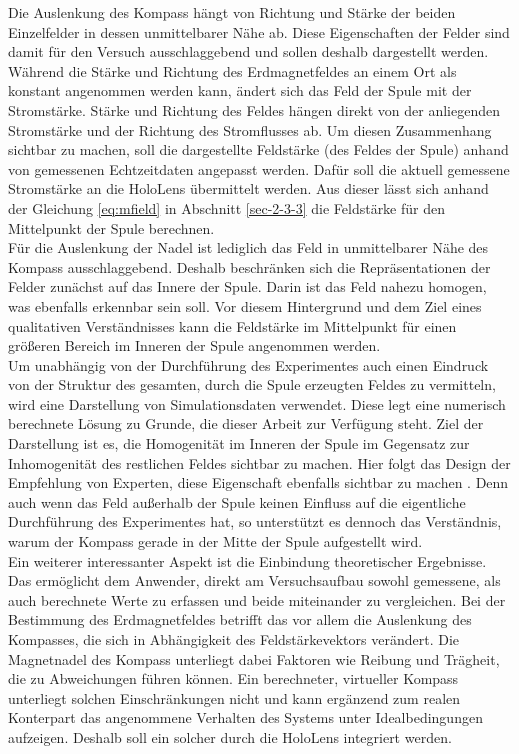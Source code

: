 Die Auslenkung des Kompass hängt von Richtung und Stärke der beiden Einzelfelder in dessen unmittelbarer Nähe ab. Diese Eigenschaften der Felder sind damit für den Versuch ausschlaggebend und sollen deshalb dargestellt werden.\\
\noindent\hspace*{5mm}
Während die Stärke und Richtung des Erdmagnetfeldes an einem Ort als konstant angenommen werden kann, ändert sich das Feld der Spule mit der Stromstärke. Stärke und Richtung des Feldes hängen direkt von der anliegenden Stromstärke und der Richtung des Stromflusses ab. Um diesen Zusammenhang sichtbar zu machen, soll die dargestellte Feldstärke (des Feldes der Spule) anhand von gemessenen Echtzeitdaten angepasst werden. Dafür soll die aktuell gemessene Stromstärke an die HoloLens übermittelt werden. Aus dieser lässt sich anhand der Gleichung \ref{eq:mfield} in Abschnitt \ref{sec-2-3-3} die Feldstärke für den Mittelpunkt der Spule berechnen.\\

Für die Auslenkung der Nadel ist lediglich das Feld in unmittelbarer Nähe des Kompass ausschlaggebend. Deshalb beschränken sich die Repräsentationen der Felder zunächst auf das Innere der Spule. Darin ist das Feld nahezu homogen, was ebenfalls erkennbar sein soll. Vor diesem Hintergrund und dem Ziel eines qualitativen Verständnisses kann die Feldstärke im Mittelpunkt für einen größeren Bereich im Inneren der Spule angenommen werden.\\

Um unabhängig von der Durchführung des Experimentes auch einen Eindruck von der Struktur des gesamten, durch die Spule erzeugten Feldes zu vermitteln, wird eine Darstellung von Simulationsdaten verwendet. Diese legt eine numerisch berechnete Lösung zu Grunde, die dieser  Arbeit zur Verfügung steht. Ziel der Darstellung ist es, die Homogenität im Inneren der Spule im Gegensatz zur Inhomogenität des restlichen Feldes sichtbar zu machen. Hier folgt das Design der Empfehlung von Experten, diese Eigenschaft ebenfalls sichtbar zu machen \autocite{Reinholz18}. Denn auch wenn das Feld außerhalb der Spule keinen Einfluss auf die eigentliche Durchführung des Experimentes hat, so unterstützt es dennoch das Verständnis, warum der Kompass gerade in der Mitte der Spule aufgestellt wird.\\

Ein weiterer interessanter Aspekt ist die Einbindung theoretischer Ergebnisse. Das ermöglicht dem Anwender, direkt am Versuchsaufbau sowohl gemessene, als auch berechnete Werte zu erfassen und beide miteinander zu vergleichen. Bei der Bestimmung des Erdmagnetfeldes betrifft das vor allem die Auslenkung des Kompasses, die sich in Abhängigkeit des Feldstärkevektors verändert. Die Magnetnadel des Kompass unterliegt dabei Faktoren wie Reibung und Trägheit, die zu Abweichungen führen können. Ein berechneter, virtueller Kompass unterliegt solchen Einschränkungen nicht und kann ergänzend zum realen Konterpart das angenommene Verhalten des Systems unter Idealbedingungen aufzeigen. Deshalb soll ein solcher durch die HoloLens integriert werden.\\


